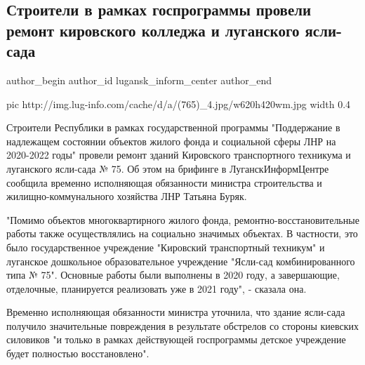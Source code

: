  
 
 
 
 
 
\subsection{Строители в рамках госпрограммы провели ремонт кировского колледжа и луганского ясли-сада}
\label{sec:30_12_2020.news.lnr.lug_info.lugansk_inform_center.2.remont_lugansk_jasli_sad}
\ifcmt
	author_begin
   author_id lugansk_inform_center
	author_end
\fi

\ifcmt
  pic http://img.lug-info.com/cache/d/a/(765)_4.jpg/w620h420wm.jpg
  width 0.4
\fi

Строители Республики в рамках государственной программы "Поддержание в
надлежащем состоянии объектов жилого фонда и социальной сферы ЛНР на 2020-2022
годы" провели ремонт зданий Кировского транспортного техникума и луганского
ясли-сада № 75. Об этом на брифинге в ЛуганскИнформЦентре сообщила временно
исполняющая обязанности министра строительства и жилищно-коммунального
хозяйства ЛНР Татьяна Буряк.

"Помимо объектов многоквартирного жилого фонда, ремонтно-восстановительные
работы также осуществлялись на социально значимых объектах. В частности, это
было государственное учреждение "Кировский транспортный техникум" и луганское
дошкольное образовательное учреждение "Ясли-сад комбинированного типа № 75".
Основные работы были выполнены в 2020 году, а завершающие, отделочные,
планируется реализовать уже в 2021 году", - сказала она.

Временно исполняющая обязанности министра уточнила, что здание ясли-сада
получило значительные повреждения в результате обстрелов со стороны киевских
силовиков "и только в рамках действующей госпрограммы детское учреждение будет
полностью восстановлено".

